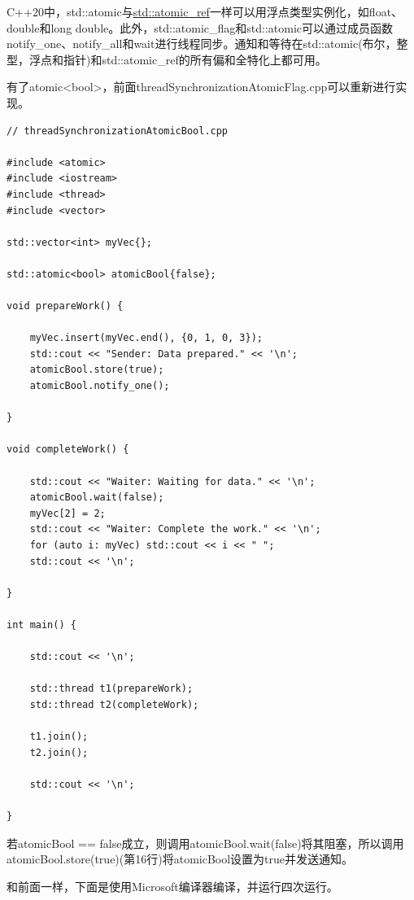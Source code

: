 
C++20中，std::atomic与\href{https://en.cppreference.com/w/cpp/atomic/atomic}{std::atomic\_ref}一样可以用浮点类型实例化，如float、double和long double。此外，std::atomic\_flag和std::atomic可以通过成员函数notify\_one、notify\_all和wait进行线程同步。通知和等待在std::atomic(布尔，整型，浮点和指针)和std::atomic\_ref的所有偏和全特化上都可用。

有了atomic<bool>，前面threadSynchronizationAtomicFlag.cpp可以重新进行实现。

\begin{lstlisting}[style=styleCXX]
// threadSynchronizationAtomicBool.cpp

#include <atomic>
#include <iostream>
#include <thread>
#include <vector>

std::vector<int> myVec{};

std::atomic<bool> atomicBool{false};

void prepareWork() {

	myVec.insert(myVec.end(), {0, 1, 0, 3});
	std::cout << "Sender: Data prepared." << '\n';
	atomicBool.store(true);
	atomicBool.notify_one();

}

void completeWork() {

	std::cout << "Waiter: Waiting for data." << '\n';
	atomicBool.wait(false);
	myVec[2] = 2;
	std::cout << "Waiter: Complete the work." << '\n';
	for (auto i: myVec) std::cout << i << " ";
	std::cout << '\n';

}

int main() {

	std::cout << '\n';
	
	std::thread t1(prepareWork);
	std::thread t2(completeWork);
	
	t1.join();
	t2.join();
	
	std::cout << '\n';

}
\end{lstlisting}

若atomicBool == false成立，则调用atomicBool.wait(false)将其阻塞，所以调用atomicBool.store(true)(第16行)将atomicBool设置为true并发送通知。

和前面一样，下面是使用Microsoft编译器编译，并运行四次运行。

